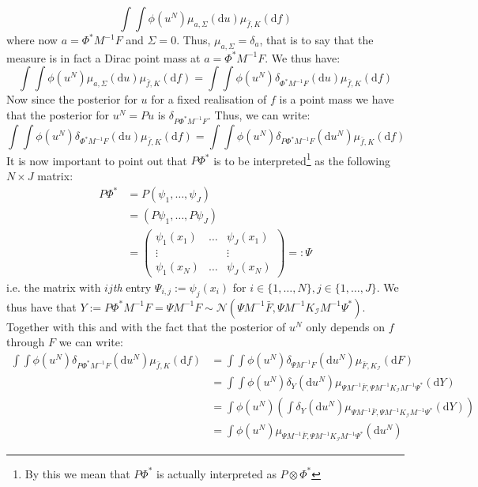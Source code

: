 \begin{equation}
    \int\int\phi(u^{N})\mu_{a,\Sigma}(\mathrm{d}u)\mu_{\bar{f},K}(\mathrm{d}f)
\end{equation}
where now $a=\Phi^{*}M^{-1}F$ and $\Sigma=0$. Thus, $\mu_{a,\Sigma}=\delta_{a}$, that is to say that the measure is in fact a Dirac point mass at $a=\Phi^{*}M^{-1}F$. We thus have:
\begin{equation*}
    \int\int\phi(u^{N})\mu_{a,\Sigma}(\mathrm{d}u)\mu_{\bar{f},K}(\mathrm{d}f)=\int\int\phi(u^N)\delta_{\Phi^{*}M^{-1}F}(\mathrm{d}u)\mu_{\bar{f},K}(\mathrm{d}f)
\end{equation*}
Now since the posterior for $u$ for a fixed realisation of $f$ is a point mass we have that the posterior for $u^N=Pu$ is $\delta_{P\Phi^{*}M^{-1}F}$. Thus, we can write:
\begin{equation*}
    \int\int\phi(u^N)\delta_{\Phi^{*}M^{-1}F}(\mathrm{d}u)\mu_{\bar{f},K}(\mathrm{d}f)=\int\int\phi(u^N)\delta_{P\Phi^{*}M^{-1}F}(\mathrm{d}u^N)\mu_{\bar{f},K}(\mathrm{d}f)
\end{equation*}
It is now important to point out that $P\Phi^{*}$ is to be interpreted\footnote{By this we mean that $P\Phi^{*}$ is actually interpreted as $P\otimes\Phi^{*}$} as the following $N\times J$ matrix:
\begin{align*}
    P\Phi^{*}&=P(\psi_{1},\dots,\psi_{J}) \\
    &=(P\psi_{1},\dots,P\psi_{J}) \\
    &=\begin{pmatrix}
        \psi_{1}(x_1) & \dots & \psi_{J}(x_1) \\
        \vdots & & \vdots \\
        \psi_{1}(x_N) & \dots & \psi_{J}(x_N)
      \end{pmatrix}=:\Psi
\end{align*}
i.e. the matrix with $ij$\textit{th} entry $\Psi_{i,j}:=\psi_{j}(x_{i})$ for $i\in\{1,\dots,N\},j\in\{1,\dots,J\}$. We thus have that $Y:=P\Phi^{*}M^{-1}F=\Psi M^{-1}F\sim\mathcal{N}(\Psi M^{-1}\bar{F},\Psi M^{-1}K_{\mathcal{I}}M^{-1}\Psi^{*})$. Together with this and with the fact that the posterior of $u^{N}$ only depends on $f$ through $F$ we can write:
\begin{align*}
    \int\int\phi(u^N)\delta_{P\Phi^{*}M^{-1}F}(\mathrm{d}u^N)\mu_{\bar{f},K}(\mathrm{d}f)&=\int\int\phi(u^N)\delta_{\Psi M^{-1}F}(\mathrm{d}u^{N})\mu_{\bar{F},K_{\mathcal{I}}}(\mathrm{d}F) \\
    &=\int\int\phi(u^N)\delta_{Y}(\mathrm{d}u^N)\mu_{\Psi M^{-1}\bar{F},\Psi M^{-1}K_{\mathcal{I}}M^{-1}\Psi^{*}}(\mathrm{d}Y) \\
    &=\int\phi(u^N)\left(\int\delta_{Y}(\mathrm{d}u^N)\mu_{\Psi M^{-1}\bar{F},\Psi M^{-1}K_{\mathcal{I}}M^{-1}\Psi^{*}}(\mathrm{d}Y)\right) \\
    &=\int\phi(u^N)\mu_{\Psi M^{-1}\bar{F},\Psi M^{-1}K_{\mathcal{I}}M^{-1}\Psi^{*}}(\mathrm{d}u^N)
\end{align*}
